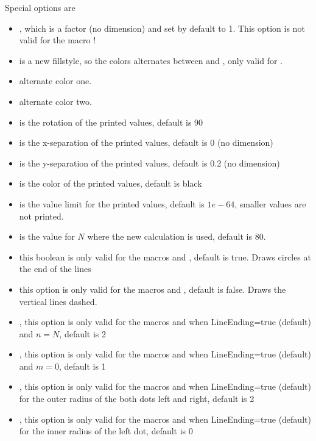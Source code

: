 \documentclass[fontsize=11pt,english,BCOR=10mm,DIV=12,bibliography=totoc,parskip=false,headings=small,
    headinclude=false,footinclude=false,oneside]{pst-doc}
\begin{document}
Special options are
\begin{itemize}
\item {}, which is a factor (no dimension) and set by default to 1. This option is not valid for
the macro !
\item {} is a new fillstyle, so the colors alternates between  and , only valid for .
\item {} alternate color one.
\item {} alternate color two.
\item {} is the rotation of the printed values, default is 90\textdegree
\item {} is the x-separation of the printed values, default is 0 (no dimension)
\item {} is the y-separation of the printed values, default is 0.2 (no dimension)
\item {} is the color of the printed values, default is black
\item {} is the value limit for the printed values, default is $1e-64$, smaller values are not printed.
\item {} is the value for $N$ where the new calculation is used, default is $80$.
\item {} this boolean is only valid for the macros  and , default is true. Draws circles at the end of the lines
\item {} this option is only valid for the macros  and , default is false. Draws the vertical lines dashed.
\item {}, this option is only valid for the macros  and  when LineEnding=true (default) and $n=N$, default is 2
\item {}, this option is only valid for the macros  and  when LineEnding=true (default) and $m=0$, default is 1
\item {}, this option is only valid for the macros  and  when LineEnding=true (default) for the outer radius of the both dots left and right, default is 2
\item {}, this option is only valid for the macros  and  when LineEnding=true (default) for the inner radius of the left dot, default is 0

\end{itemize}
\end{document}
